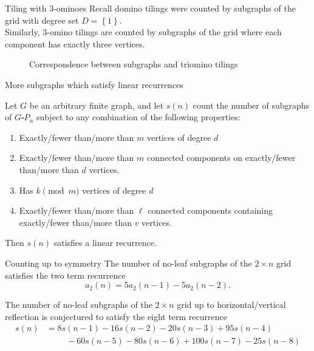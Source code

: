 \documentclass{beamer}%
\newcommand\set[1]{\left\{#1\right\}}
\begin{document}
\begin{frame}{Tiling with $3$-ominoes}
  Recall domino tilings were counted by subgraphs of the grid with degree set $D = \set{1}$.
  \\
  Similarly, $3$-omino tilings are counted by subgraphs of the grid where each
  component has exactly three vertices.
  \begin{figure}
    
    \caption{Correspondence between subgraphs and triomino tilings}
  \end{figure}

\end{frame}

\begin{frame}{More subgraphs which satisfy linear recurrences}
  \begin{theorem}
    Let $G$ be an arbitrary finite graph, and let $s(n)$ count the number of
    subgraphs of $G \square P_n$ subject to any combination of the following
    properties:
    \begin{enumerate}
      \item Exactly/fewer than/more than $m$ vertices of degree $d$
      \item Exactly/fewer than/more than $m$ connected components on
        exactly/fewer than/more than $d$ vertices.
      \item Has $k \pmod m$ vertices of degree $d$
      \item Exactly/fewer than/more than $\ell$ connected components containing
        exactly/fewer than/more than $v$ vertices.
    \end{enumerate}
    Then $s(n)$ satisfies a linear recurrence.
  \end{theorem}
\end{frame}

\begin{frame}{Counting up to symmetry} %
  The number of no-leaf subgraphs of the $2 \times n$ grid satisfies the two
  term recurrence \[
    a_2(n) = 5a_2(n-1) - 5a_2(n-2).
  \]

  The number of no-leaf subgraphs of the $2 \times n$ grid up to
  horizontal/vertical reflection is conjectured to satisfy the eight term
  recurrence
  \begin{align*}
    s(n) &= 8s(n-1) - 16s(n-2) - 20s(n-3) + 95s(n-4) \\
         &\hspace{1cm}- 60s(n-5) - 80s(n-6) + 100s(n-7) - 25s(n-8)
  \end{align*}
  
\end{frame}
\end{document}
